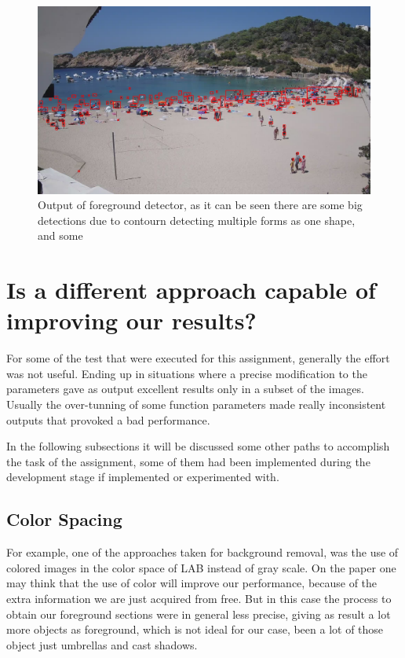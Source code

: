 \documentclass[11pt]{article}
\begin{document}
\begin{figure}
  \centering
  \includegraphics[width=\textwidth]{img/det_name.jpg}
  \caption{Output of foreground detector, as it can be seen there are some big detections due to contourn detecting multiple forms as one shape, and some }
  \label{fig:detections}
\end{figure}


\section{Is a different approach capable of improving our results?}

For some of the test that were executed for this assignment, generally the effort was not useful. Ending up in situations where a precise modification to the parameters gave as output excellent results only in a subset of the images. Usually the over-tunning of some function parameters made really inconsistent outputs that provoked a bad performance.\newline

In the following subsections it will be discussed some other paths to accomplish the task of the assignment, some of them had been implemented during the development stage if implemented or experimented with.

\subsection*{Color Spacing}

For example, one of the approaches taken for background removal, was the use of colored images in the color space of LAB  instead of gray scale. On the paper one may think that the use of color will improve our performance, because of the extra information we are just acquired from free. But in this case the process to obtain our foreground sections were in general less precise, giving as result a lot more objects as foreground, which is not ideal for our case, been a lot of those object just umbrellas and cast shadows.\newline
\end{document}

